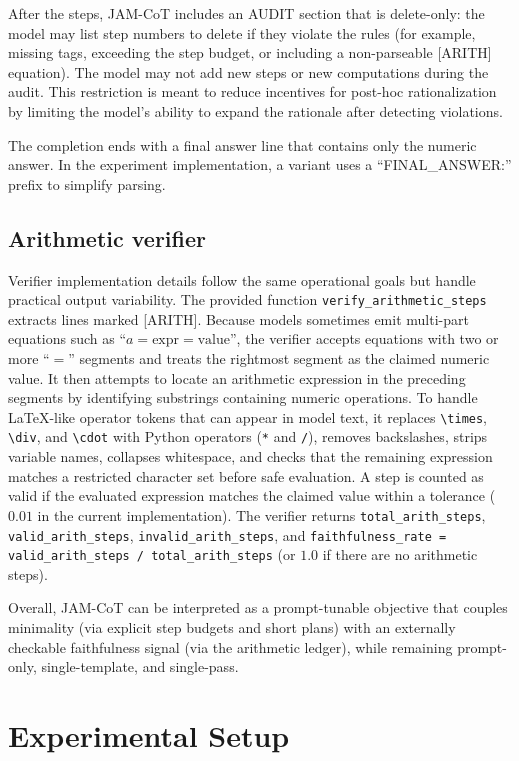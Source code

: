 \documentclass[journal,article,submit,pdftex,moreauthors]{Definitions/mdpi}
\begin{document}
After the steps, JAM-CoT includes an AUDIT section that is delete-only: the model may list step numbers to delete if they violate the rules (for example, missing tags, exceeding the step budget, or including a non-parseable [ARITH] equation). The model may not add new steps or new computations during the audit. This restriction is meant to reduce incentives for post-hoc rationalization by limiting the model’s ability to expand the rationale after detecting violations.

The completion ends with a final answer line that contains only the numeric answer. In the experiment implementation, a variant uses a ``FINAL\_ANSWER:'' prefix to simplify parsing.

\subsection{Arithmetic verifier}
Verifier implementation details follow the same operational goals but handle practical output variability. The provided function \verb|verify_arithmetic_steps| extracts lines marked [ARITH]. Because models sometimes emit multi-part equations such as ``$a = \text{expr} = \text{value}$'', the verifier accepts equations with two or more ``$=$'' segments and treats the rightmost segment as the claimed numeric value. It then attempts to locate an arithmetic expression in the preceding segments by identifying substrings containing numeric operations. To handle LaTeX-like operator tokens that can appear in model text, it replaces \verb|\times|, \verb|\div|, and \verb|\cdot| with Python operators (\verb|*| and \verb|/|), removes backslashes, strips variable names, collapses whitespace, and checks that the remaining expression matches a restricted character set before safe evaluation. A step is counted as valid if the evaluated expression matches the claimed value within a tolerance ($0.01$ in the current implementation). The verifier returns \verb|total_arith_steps|, \verb|valid_arith_steps|, \verb|invalid_arith_steps|, and \verb|faithfulness_rate = valid_arith_steps / total_arith_steps| (or $1.0$ if there are no arithmetic steps).

Overall, JAM-CoT can be interpreted as a prompt-tunable objective that couples minimality (via explicit step budgets and short plans) with an externally checkable faithfulness signal (via the arithmetic ledger), while remaining prompt-only, single-template, and single-pass.

\section{Experimental Setup}
\end{document}
